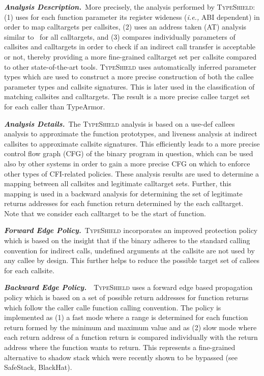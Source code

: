 \textbf{\textit{Analysis Description.}}~More precisely, the analysis performed by \textsc{TypeShield}:
(1) uses for each function parameter its register wideness (\textit{i.e.,} ABI dependent) in order to map calltargets per callsites,  
(2) uses an address taken (AT) analysis similar to~\cite{veen:typearmor} for all calltargets, and 
(3) compares individually parameters of callsites and calltargets in order to check if an indirect call transfer is acceptable or not, 
thereby providing a more fine-grained calltarget set per callsite compared to other state-of-the-art tools.
\textsc{TypeShield} uses automatically inferred parameter types which are used to construct
a more precise construction of both the callee parameter types and callsite signatures. This 
is later used in the classification of matching callsites and calltargets.
The result is a more precise callee target set for each caller than TypeArmor.

\textbf{\textit{Analysis Details.}}~The \textsc{TypeShield} analysis is based on a use-def callees analysis to approximate the function prototypes, 
and liveness analysis at indirect callsites to approximate callsite signatures. This 
efficiently leads to a more precise control flow graph (CFG) of the binary program in question, 
which can be used also by other systems in order to gain a more precise CFG on which to 
enforce other types of CFI-related policies. These analysis results are used to
determine a mapping between all callsites and legitimate calltarget sets. Further,
this mapping is used in a backward analysis for determining the set of legitimate 
returns addresses for each function return determined by the each calltarget. Note that 
we consider each calltarget to be the start of function.

\textbf{\textit{Forward Edge Policy.}}~\textsc{TypeShield} incorporates an improved protection policy which is
based on the insight that if the binary adheres to the standard calling convention
for indirect calls, undefined arguments at the callsite are not used by any callee by design. 
This further helps to reduce the possible target set of callees for each callsite.

\textbf{\textit{Backward Edge Policy.}}~~\textsc{TypeShield} uses a forward edge based propagation policy
which is based on a set of possible return addresses for function returns which follow the caller calle function calling convention.
The policy is implemented as (1) a fast mode where a range is determined for each function return formed by the minimum and maximum value and
as (2) slow mode where each return address of a function return is compared individually with the return address where the function wants to return.
This represents a fine-grained alternative to shadow stack which were recently shown to be bypassed (see SafeStack, BlackHat).

